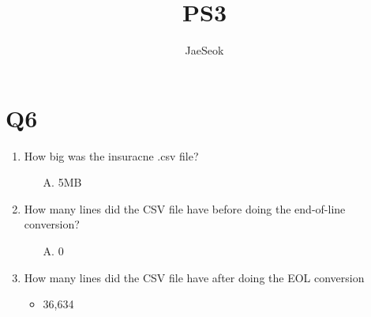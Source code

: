 \documentclass{article}
\title{PS3}
\author{JaeSeok}
\begin{document}
\maketitle


\section*{Q6}

\begin{enumerate}
    \item How big was the insuracne .csv file?
    \begin{itemize}
        \item[A.] 5MB 
    \end{itemize}
    \item How many lines did the CSV file have before doing the end-of-line conversion?
    \begin{itemize}
        \item[A.] 0 
    \end{itemize}
    \item How many lines did the CSV file have after doing the EOL conversion
    \begin{itemize}
        \item 36,634
    \end{itemize}
\end{enumerate}
\end{document}

